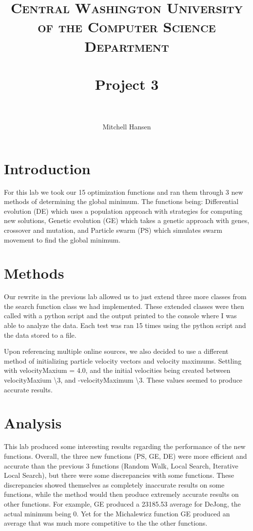 \documentclass[paper=a4, fontsize=11pt]{scrartcl}
\title{
		\usefont{OT1}{bch}{b}{n}
		\normalfont \normalsize \textsc{Central Washington University of the Computer Science Department} \\ [25pt]
		\horrule{0.5pt} \\[0.4cm]
		\huge Project 3 \\
		\horrule{2pt} \\[0.5cm]
}
\author{\normalsize Mitchell Hansen \\[-6pt]}
\numberwithin{equation}{section}
\numberwithin{figure}{section}
\numberwithin{table}{section}
\begin{document}
\maketitle

\section{Introduction}
For this lab we took our 15 optimization functions and ran them through
3 new methods of determining the global minimum. The functions being:
Differential evolution (DE) which uses a population approach with strategies
for computing new solutions, Genetic evolution (GE) which takes a genetic approach
with genes, crossover and mutation, and Particle swarm (PS) which simulates
swarm movement to find the global minimum.

\section{Methods}
Our rewrite in the previous lab allowed us to just extend three more
classes from the search function class we had implemented. These
extended classes were then called with a python script and the output
printed to the console where I was able to analyze the data. Each test
was ran 15 times using the python script and the data stored to a file.

Upon referencing multiple online sources, we also decided to use a different
method of initializing particle velocity vectors and velocity maximums. Settling
with velocityMaxium = 4.0, and the initial velocities being created between
velocityMaxium \textbackslash 3, and -velocityMaximum \textbackslash 3.
These values seemed to produce accurate results.



\section{Analysis}
This lab produced some interesting results regarding the performance of the
new functions. Overall, the three new functions (PS, GE, DE) were more
efficient and accurate than the previous 3 functions (Random Walk, Local Search,
Iterative Local Search), but there were some discrepancies with some
functions. These discrepancies showed themselves as completely inaccurate
results on some functions, while the method would then produce extremely accurate
results on other functions. For example, GE produced a 23185.53 average for DeJong,
the actual minimum being 0. Yet for the Michalewicz function GE produced an average
that was much more competitive to the the other functions.
\end{document}
